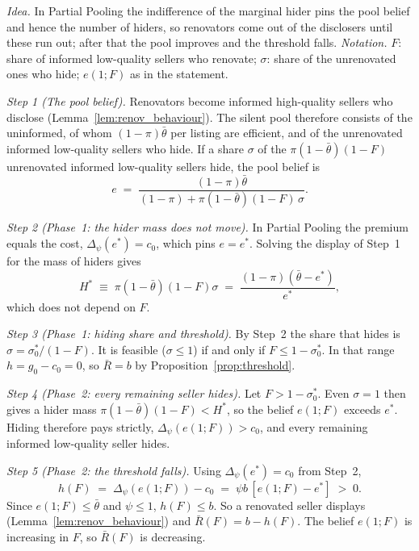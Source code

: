 \upshape
\emph{Idea.} In Partial Pooling the indifference of the marginal hider pins the pool belief and hence the number of hiders, so renovators come out of the disclosers until these run out; after that the pool improves and the threshold falls. \emph{Notation.} $F$: share of informed low-quality sellers who renovate; $\sigma$: share of the unrenovated ones who hide; $e(1;F)$ as in the statement.

\emph{Step 1 (The pool belief).} Renovators become informed high-quality sellers who disclose (Lemma~\ref{lem:renov_behaviour}). The silent pool therefore consists of the uninformed, of whom $(1-\pi)\bar\theta$ per listing are efficient, and of the unrenovated informed low-quality sellers who hide. If a share $\sigma$ of the $\pi(1-\bar\theta)(1-F)$ unrenovated informed low-quality sellers hide, the pool belief is
\begin{equation*}
    e\;=\;\frac{(1-\pi)\bar\theta}{(1-\pi)+\pi(1-\bar\theta)(1-F)\,\sigma}.
\end{equation*}

\emph{Step 2 (Phase~1: the hider mass does not move).} In Partial Pooling the premium equals the cost, $\Delta_\psi(e^*)=c_0$, which pins $e=e^*$. Solving the display of Step~1 for the mass of hiders gives
\begin{equation*}
    H^*\;\equiv\;\pi(1-\bar\theta)(1-F)\sigma\;=\;\frac{(1-\pi)(\bar\theta-e^*)}{e^*},
\end{equation*}
which does not depend on $F$.

\emph{Step 3 (Phase~1: hiding share and threshold).} By Step~2 the share that hides is $\sigma=\sigma_0^*/(1-F)$. It is feasible ($\sigma\le1$) if and only if $F\le1-\sigma_0^*$. In that range $h=g_0-c_0=0$, so $\bar R=b$ by Proposition~\ref{prop:threshold}.

\emph{Step 4 (Phase~2: every remaining seller hides).} Let $F>1-\sigma_0^*$. Even $\sigma=1$ then gives a hider mass $\pi(1-\bar\theta)(1-F)<H^*$, so the belief $e(1;F)$ exceeds $e^*$. Hiding therefore pays strictly, $\Delta_\psi(e(1;F))>c_0$, and every remaining informed low-quality seller hides.

\emph{Step 5 (Phase~2: the threshold falls).} Using $\Delta_\psi(e^*)=c_0$ from Step~2,
\begin{equation*}
    h(F)\;=\;\Delta_\psi(e(1;F))-c_0\;=\;\psi b\,[e(1;F)-e^*]\;>\;0.
\end{equation*}
Since $e(1;F)\le\bar\theta$ and $\psi\le1$, $h(F)\le b$. So a renovated seller displays (Lemma~\ref{lem:renov_behaviour}) and $\bar R(F)=b-h(F)$. The belief $e(1;F)$ is increasing in $F$, so $\bar R(F)$ is decreasing.

